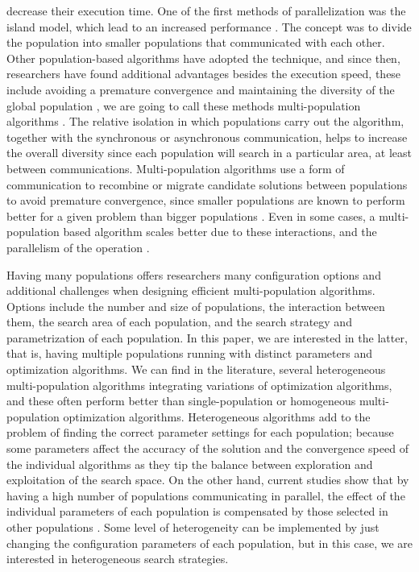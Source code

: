 decrease their execution time. %
One of the first methods of parallelization was the island
model, which lead to an increased performance
\cite{gorges1990explicit,grosso1985computer}. The concept was to divide the
population into smaller populations that communicated with each other. Other
population-based algorithms have adopted the technique, and since then,
researchers have found additional advantages besides the execution speed, 
these include avoiding a premature convergence and maintaining the diversity of the
global population \cite{li2015multi}, we are going to call these methods 
multi-population algorithms \cite{Ma2019}. The relative 
isolation in which populations carry out the algorithm, together with the
synchronous or asynchronous communication, helps to increase the overall
diversity since each population will search in a particular area, at least
between communications. Multi-population algorithms use a form of
communication to recombine or migrate candidate solutions between populations
to avoid premature convergence, since smaller populations are known to perform
better for a given problem than bigger populations
\cite{li2016multi,wu2016differential}.  Even in some cases, a multi-population based
algorithm scales better due to these interactions, and the parallelism of the
operation \cite{ALBA20027}. 

Having many populations offers researchers many configuration options and
additional challenges when designing efficient multi-population algorithms.
Options include the number and size of populations, the interaction between
them, the search area of each population, and the search strategy and
parametrization of each population.  In this paper, we are interested in the
latter, that is, having multiple populations running with distinct parameters
and optimization algorithms. We can find in the literature, several
heterogeneous multi-population algorithms integrating variations of optimization
algorithms, and these often perform better than single-population or homogeneous
multi-population optimization algorithms\cite{wu2016differential,nseef2016adaptive}.
Heterogeneous algorithms add to
the problem of finding the correct parameter settings for each population;
because some parameters affect the accuracy of the solution and the convergence
speed of the individual algorithms as they tip the balance between exploration
and exploitation of the search space. On the other hand, current studies show
that by having a high number of populations communicating in parallel, the
effect of the individual parameters of each population is compensated by those
selected in other populations \cite{li2016multi,tanabe2013evaluation}. Some
level of heterogeneity can be implemented by just changing the configuration
parameters of each population, but in this case, we are interested in
heterogeneous search strategies.

